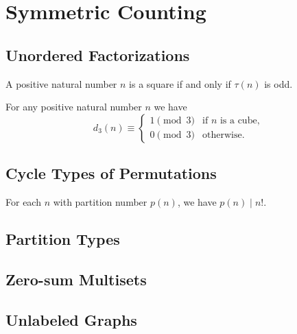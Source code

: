 \chapter{Symmetric Counting}

\section{Unordered Factorizations}

\begin{theorem}
  A positive natural number $n$ is a square if and only if $\tau(n)$ is odd.
\end{theorem}

\begin{theorem}
  For any positive natural number $n$ we have
  \begin{equation*}
    d_3(n)\equiv
    \begin{cases}
      1 \pmod{3} & \text{if $n$ is a cube,} \\
      0 \pmod{3} & \text{otherwise.}
    \end{cases}
  \end{equation*}
\end{theorem}

\section{Cycle Types of Permutations}

\begin{theorem}
  For each $n$ with partition number $p(n)$, we have $p(n)\mid n!$.
\end{theorem}

\section{Partition Types}

\section{Zero-sum Multisets}

\section{Unlabeled Graphs}


